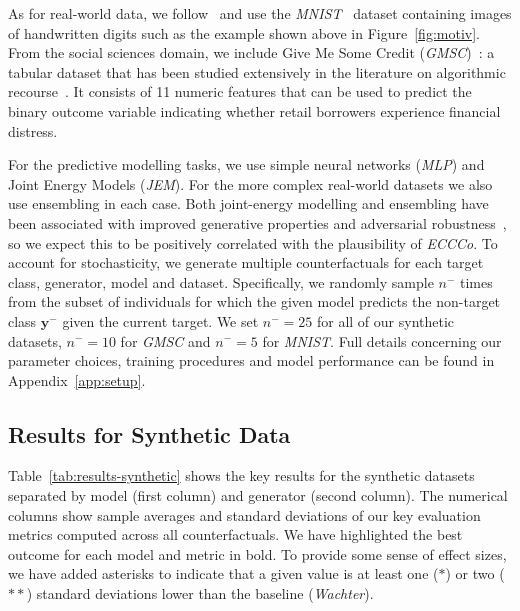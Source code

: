 As for real-world data, we follow~\citet{schut2021generating} and use the \textit{MNIST}~\citep{lecun1998mnist} dataset containing images of handwritten digits such as the example shown above in Figure~\ref{fig:motiv}. From the social sciences domain, we include Give Me Some Credit (\textit{GMSC})~\citep{kaggle2011give}: a tabular dataset that has been studied extensively in the literature on algorithmic recourse~\citep{pawelczyk2021carla}. It consists of 11 numeric features that can be used to predict the binary outcome variable indicating whether retail borrowers experience financial distress. 

For the predictive modelling tasks, we use simple neural networks (\textit{MLP}) and Joint Energy Models (\textit{JEM}). For the more complex real-world datasets we also use ensembling in each case. Both joint-energy modelling and ensembling have been associated with improved generative properties and adversarial robustness~\citep{grathwohl2020your,lakshminarayanan2016simple}, so we expect this to be positively correlated with the plausibility of \textit{ECCCo}. To account for stochasticity, we generate multiple counterfactuals for each target class, generator, model and dataset. Specifically, we randomly sample $n^{-}$ times from the subset of individuals for which the given model predicts the non-target class $\mathbf{y}^{-}$ given the current target. We set $n^{-}=25$ for all of our synthetic datasets, $n^{-}=10$ for \textit{GMSC} and $n^{-}=5$ for \textit{MNIST}. Full details concerning our parameter choices, training procedures and model performance can be found in Appendix~\ref{app:setup}.

\subsection{Results for Synthetic Data}

Table~\ref{tab:results-synthetic} shows the key results for the synthetic datasets separated by model (first column) and generator (second column). The numerical columns show sample averages and standard deviations of our key evaluation metrics computed across all counterfactuals. We have highlighted the best outcome for each model and metric in bold. To provide some sense of effect sizes, we have added asterisks to indicate that a given value is at least one ($*$) or two ($**$) standard deviations lower than the baseline (\textit{Wachter}).

